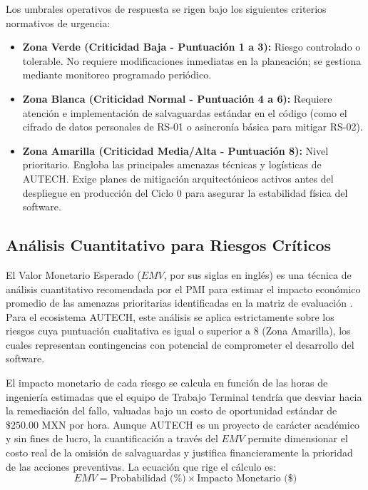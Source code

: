 Los umbrales operativos de respuesta se rigen bajo los siguientes criterios normativos de urgencia:
\begin{itemize}
    \item \textbf{Zona Verde (Criticidad Baja - Puntuación 1 a 3):} Riesgo controlado o tolerable. No requiere modificaciones inmediatas en la planeación; se gestiona mediante monitoreo programado periódico.
    \item \textbf{Zona Blanca (Criticidad Normal - Puntuación 4 a 6):} Requiere atención e implementación de salvaguardas estándar en el código (como el cifrado de datos personales de RS-01 o asincronía básica para mitigar RS-02).
    \item \textbf{Zona Amarilla (Criticidad Media/Alta - Puntuación 8):} Nivel prioritario. Engloba las principales amenazas técnicas y logísticas de AUTECH. Exige planes de mitigación arquitectónicos activos antes del despliegue en producción del Ciclo 0 para asegurar la estabilidad física del software.
\end{itemize}

\subsection{Análisis Cuantitativo para Riesgos Críticos}
\label{subsec:analisis_cuantitativo}

El Valor Monetario Esperado ($EMV$, por sus siglas en inglés) es una técnica de análisis cuantitativo recomendada por el PMI para estimar el impacto económico promedio de las amenazas prioritarias identificadas en la matriz de evaluación \cite{pressman2020}. Para el ecosistema AUTECH, este análisis se aplica estrictamente sobre los riesgos cuya puntuación cualitativa es igual o superior a 8 (Zona Amarilla), los cuales representan contingencias con potencial de comprometer el desarrollo del software.

El impacto monetario de cada riesgo se calcula en función de las horas de ingeniería estimadas que el equipo de Trabajo Terminal tendría que desviar hacia la remediación del fallo, valuadas bajo un costo de oportunidad estándar de $\$250.00$ MXN por hora. Aunque AUTECH es un proyecto de carácter académico y sin fines de lucro, la cuantificación a través del $EMV$ permite dimensionar el costo real de la omisión de salvaguardas y justifica financieramente la prioridad de las acciones preventivas. La ecuación que rige el cálculo es:
\begin{equation}
    EMV = \text{Probabilidad (\%)} \times \text{Impacto Monetario (\$)}
\end{equation}

